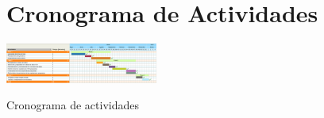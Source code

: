 \section{Cronograma de Actividades}
\begin{table}[!htb]
    \centering
    \includegraphics[angle=90,width=50mm]{Imagenes/cronograma.png}
    \caption{Cronograma de actividades}
    \label{tab:tab1}
\end{table}



